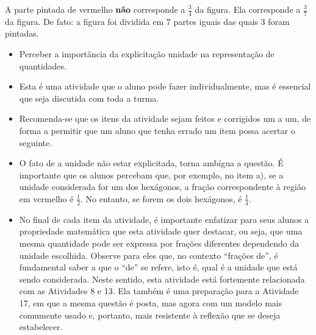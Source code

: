 \begin{multicols}{2}
\begin{orientacoes}
\end{orientacoes}

\begin{solucao}{}{}
  A parte pintada de vermelho   {\bf não}   corresponde a   $\frac{3}{4}$ da figura. Ela corresponde a   $\frac{3}{7}$ da figura. De fato: a figura foi dividida em   $7$ partes iguais das quais   $3$ foram pintadas.

\end{solucao}



\begin{objetivos}{}{}
\begin{itemize} %
    \item       Perceber a importância da explicitação unidade na representação de quantidades.
\end{itemize} %
\end{objetivos}

\begin{orientacoes}
\begin{itemize} %
    \item       Esta é uma atividade que o aluno pode fazer individualmente, mas é essencial que seja discutida com toda a turma.
    \item       Recomenda-se que os itens da atividade sejam feitos e corrigidos um a um, de forma a permitir que um aluno que tenha errado um item possa acertar o seguinte.
    \item       O fato de a unidade não estar explicitada, torna ambígua a questão. É importante que os alunos percebam que, por exemplo, no item a), se a unidade considerada for um dos hexágonos, a fração correspondente à região em vermelho é $\frac{1}{2}$. No entanto, se forem os dois hexágonos, é $\frac{1}{4}$.
    \item       No final de cada item da atividade, é importante enfatizar para seus alunos a propriedade matemática que esta atividade quer destacar, ou seja, que uma mesma quantidade pode ser expressa por frações diferentes dependendo da unidade escolhida. Observe para eles que, no contexto       ``frações de'', é fundamental saber a que o       ``de''     se refere, isto é, qual é a unidade que está sendo considerada. Neste sentido, esta atividade está fortemente relacionada com as Atividades 8 e 13. Ela também é uma preparação para a Atividade 17, em que a mesma questão é posta, mas agora com um modelo mais comumente usado e, portanto, mais resistente à reflexão que se deseja estabelecer.
\end{itemize} %
\end{orientacoes}


\end{multicols}
